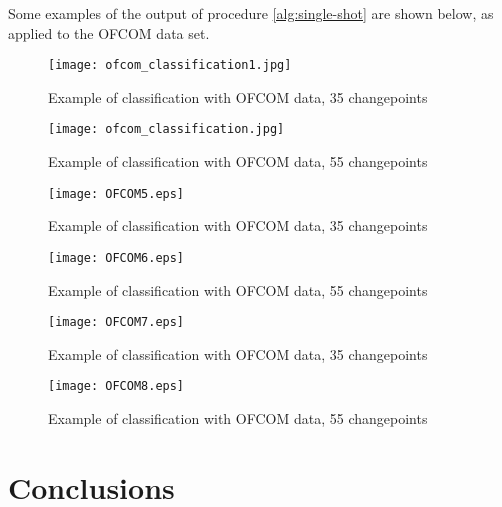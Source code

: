 Some examples of the output of procedure \ref{alg:single-shot} are shown below, as applied to the OFCOM data set.

\begin{figure}[h]
\centering
\texttt{[image: ofcom\_classification1.jpg]}
\caption{Example of classification with OFCOM data, 35 changepoints}
\label{fig:hvb}
\end{figure}

\begin{figure}[h]
\centering
\texttt{[image: ofcom\_classification.jpg]}
\caption{Example of classification with OFCOM data, 55 changepoints}
\label{fig:hvb}
\end{figure}

\begin{figure}[h]
\centering
\texttt{[image: OFCOM5.eps]}
\caption{Example of classification with OFCOM data, 35 changepoints}
\label{fig:hvb}
\end{figure}

\begin{figure}[h]
\centering
\texttt{[image: OFCOM6.eps]}
\caption{Example of classification with OFCOM data, 55 changepoints}
\label{fig:hvb}
\end{figure}

\begin{figure}[h]
\centering
\texttt{[image: OFCOM7.eps]}
\caption{Example of classification with OFCOM data, 35 changepoints}
\label{fig:hvb}
\end{figure}

\begin{figure}[h]
\centering
\texttt{[image: OFCOM8.eps]}
\caption{Example of classification with OFCOM data, 55 changepoints}
\label{fig:hvb}
\end{figure}

\section{Conclusions}